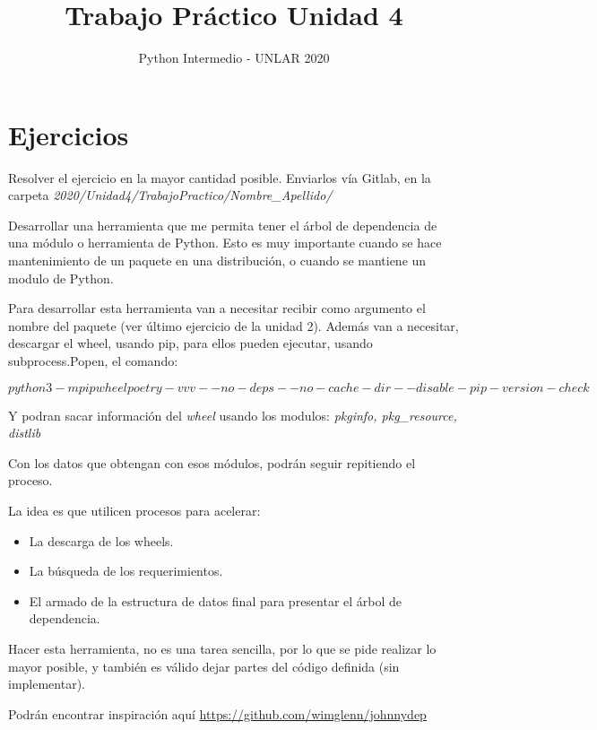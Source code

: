 \documentclass[12pt, spanish]{article}
\title{Trabajo Práctico Unidad 4}
\author{Python Intermedio - UNLAR 2020}
\begin{document}
\maketitle

\section{Ejercicios}

Resolver el ejercicio en la mayor cantidad posible. Enviarlos vía Gitlab, en la carpeta
\textit{2020/Unidad4/TrabajoPractico/Nombre\_Apellido/}

Desarrollar una herramienta que me permita tener el árbol de dependencia de una módulo o 
herramienta de Python. Esto es muy importante cuando se hace mantenimiento de un paquete
en una distribución, o cuando se mantiene un modulo de Python.

Para desarrollar esta herramienta van a necesitar recibir como argumento el nombre del paquete
(ver último ejercicio de la unidad 2). Además van a necesitar, descargar el wheel, usando pip,
para ellos pueden ejecutar, usando subprocess.Popen, el comando:

$$python3 -m pip wheel poetry -vvv --no-deps --no-cache-dir --disable-pip-version-check$$

Y podran sacar información del \textit{wheel} usando los modulos: \textit{pkginfo, pkg\_resource,
distlib}

Con los datos que obtengan con esos módulos, podrán seguir repitiendo el proceso.

La idea es que utilicen procesos para acelerar:

\begin{itemize}
	\item La descarga de los wheels.
	\item La búsqueda de los requerimientos.
	\item El armado de la estructura de datos final para presentar el árbol de dependencia.
\end{itemize}

Hacer esta herramienta, no es una tarea sencilla, por lo que se pide realizar lo mayor
posible, y también es válido dejar partes del código definida (sin implementar).

Podrán encontrar inspiración aquí \url{https://github.com/wimglenn/johnnydep}
\end{document}
